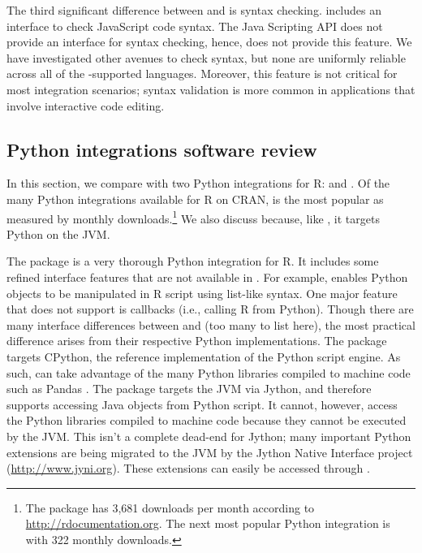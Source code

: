 The third significant difference between  and  is syntax checking.  includes an interface to check JavaScript code syntax. The Java Scripting API does not provide an interface for syntax checking, hence,  does not provide this feature. We have investigated other avenues to check syntax, but none are uniformly reliable across all of the -supported languages. Moreover, this feature is not critical for most integration scenarios; syntax validation is more common in applications that involve interactive code editing.

\hypertarget{python-integrations}{}
\subsection{Python integrations software review}

In this section, we compare  with two Python integrations for R:  \citep{reticulate} and  \citep{rjython}. Of the many Python integrations available for R on CRAN,  is the most popular as measured by monthly downloads.\footnote{The  package has 3,681 downloads per month according to \url{http://rdocumentation.org}. The next most popular Python integration is  \citep{pythoninr} with 322 monthly downloads.} We also discuss  because, like , it targets Python on the JVM.

The  package is a very thorough Python integration for R. It includes some refined interface features that are not available in . For example,  enables Python objects to be manipulated in R script using list-like syntax. One major  feature that  does not support is callbacks (i.e., calling R from Python). Though there are many interface differences between  and  (too many to list here), the most practical difference arises from their respective Python implementations. The  package targets CPython, the reference implementation of the Python script engine. As such,  can take advantage of the many Python libraries compiled to machine code such as Pandas \citep{pandas}. The  package targets the JVM via Jython, and therefore supports accessing Java objects from Python script. It cannot, however, access the Python libraries compiled to machine code because they cannot be executed by the JVM. This isn't a complete dead-end for Jython; many important Python extensions are being migrated to the JVM by the Jython Native Interface project (\url{http://www.jyni.org}). These extensions can easily be accessed through .

